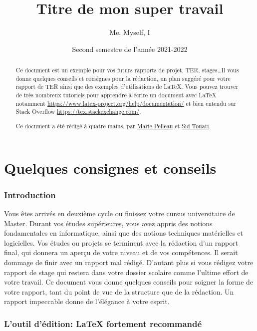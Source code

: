 \documentclass{rapport}
\title{Titre de mon super travail}
\author{Me, Myself, I}
\date{Second semestre de l'année 2021-2022}
\def\Latex{\LaTeX\xspace}
\begin{document}
  \maketitle

  \begin{abstract}
    Ce document est un exemple pour vos futurs rapports de projet, TER, stages\dots Il vous donne quelques conseils et consignes pour la rédaction, un plan suggéré pour votre rapport de TER ainsi que des exemples d'utilisations de \Latex. Vous pouvez trouver de très nombreux tutoriels pour apprendre à écrire un document avec \Latex notamment \url{https://www.latex-project.org/help/documentation/} et bien entendu sur Stack Overflow \url{https://tex.stackexchange.com/}.
  
    Ce document a été rédigé à quatre mains, par \href{mailto:marie.pelleau@univ-cotedazur.fr}{Marie Pelleau} et \href{mailto:sid.touati@univ-cotedazur.fr}{Sid Touati}.
  \end{abstract}

  \clearpage
  \tableofcontents

  \clearpage

  \part{Quelques consignes et conseils}

    \section{Introduction}
    
      Vous êtes arrivés en deuxième cycle ou finissez votre cursus universitaire de Master. Durant vos études supérieures, vous avez appris des notions fondamentales en informatique, ainsi que des notions techniques matérielles et logicielles. Vos études ou projets se terminent avec la rédaction d'un rapport final, qui donnera un aperçu de votre niveau et de vos compétences. Il serait dommage de finir avec un rapport mal rédigé. D'autant plus si vous rédigez votre rapport de stage qui restera dans votre dossier scolaire comme l'ultime effort de votre travail. Ce document vous donne quelques conseils pour soigner la forme de votre rapport, tant du point de vue de la structure que de la rédaction. Un rapport impeccable donne de l'élégance à votre esprit.
    
    \section{L'outil d'édition: \Latex fortement recommandé} 
      
\end{document}
